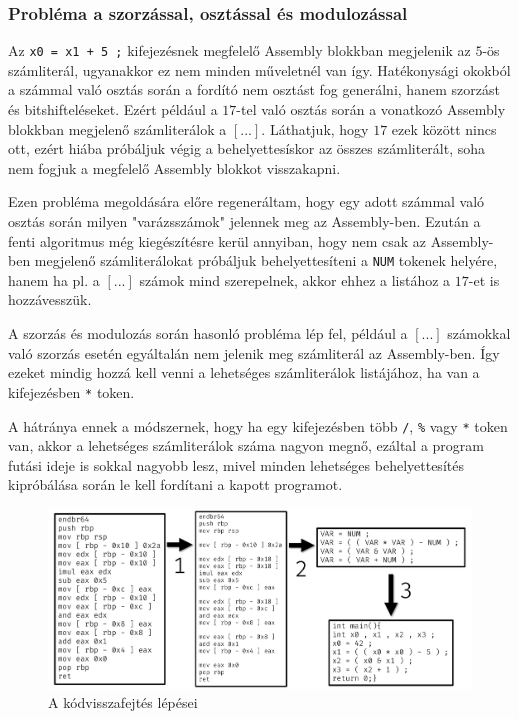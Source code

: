 \subsubsection{Probléma a szorzással, osztással és modulozással}
Az \texttt{x0 = x1 + 5 ;} kifejezésnek megfelelő Assembly blokkban 
megjelenik az $5$-ös számliterál, ugyanakkor ez nem minden műveletnél van így.
Hatékonysági okokból a számmal való osztás során a fordító nem osztást fog
generálni, hanem szorzást és bitshifteléseket. Ezért például a $17$-tel való
osztás során a vonatkozó Assembly blokkban megjelenő számliterálok a $[...]$.
Láthatjuk, hogy $17$ ezek között nincs ott, ezért hiába próbáljuk végig
a behelyettesískor az összes számliterált, soha nem fogjuk a megfelelő Assembly
blokkot visszakapni.

Ezen probléma megoldására előre regeneráltam, hogy egy adott számmal való
osztás során milyen "varázsszámok" jelennek meg az Assembly-ben. Ezután a fenti
algoritmus még kiegészítésre kerül annyiban, hogy nem csak az Assembly-ben
megjelenő számliterálokat próbáljuk behelyettesíteni a \texttt{NUM} tokenek
helyére, hanem ha pl. a $[...]$ számok mind szerepelnek, akkor ehhez a listához
a $17$-et is hozzávesszük.

A szorzás és modulozás során hasonló probléma lép fel, például a $[...]$
számokkal való szorzás esetén egyáltalán nem jelenik meg számliterál az
Assembly-ben. Így ezeket mindig hozzá kell venni a lehetséges számliterálok
listájához, ha van a kifejezésben \texttt{*} token.

A hátránya ennek a módszernek, hogy ha egy kifejezésben több \texttt{/},
\texttt{\%} vagy \texttt{*} token van, akkor a lehetséges számliterálok száma
nagyon megnő, ezáltal a program futási ideje is sokkal nagyobb lesz, mivel
minden lehetséges behelyettesítés kipróbálása során le kell fordítani
a kapott programot.

\begin{figure}[H]
	\centering
	\includegraphics[width=1\textwidth]{images/steps.pdf}
	\caption{A kódvisszafejtés lépései}
	\label{fig:steps}
\end{figure}

